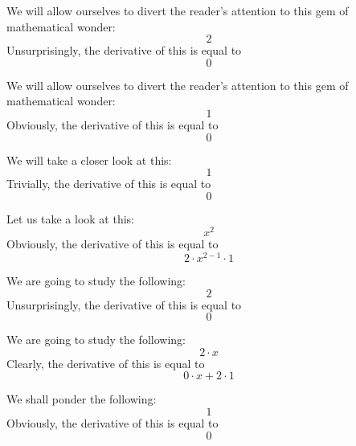 \documentclass{article}
\begin{document}
We will allow ourselves to divert the reader's attention to this gem of mathematical wonder:
\begin{equation}
2 
\end{equation}
Unsurprisingly, the derivative of this is equal to
\begin{equation}
0 
\end{equation}

We will allow ourselves to divert the reader's attention to this gem of mathematical wonder:
\begin{equation}
1 
\end{equation}
Obviously, the derivative of this is equal to
\begin{equation}
0 
\end{equation}

We will take a closer look at this:
\begin{equation}
1 
\end{equation}
Trivially, the derivative of this is equal to
\begin{equation}
0 
\end{equation}

Let us take a look at this:
\begin{equation}
x ^{2 } 
\end{equation}
Obviously, the derivative of this is equal to
\begin{equation}
2 \cdot x ^{2 - 1 } \cdot 1 
\end{equation}

We are going to study the following:
\begin{equation}
2 
\end{equation}
Unsurprisingly, the derivative of this is equal to
\begin{equation}
0 
\end{equation}

We are going to study the following:
\begin{equation}
2 \cdot x 
\end{equation}
Clearly, the derivative of this is equal to
\begin{equation}
0 \cdot x + 2 \cdot 1 
\end{equation}

We shall ponder the following:
\begin{equation}
1 
\end{equation}
Obviously, the derivative of this is equal to
\begin{equation}
0 
\end{equation}
\end{document}
